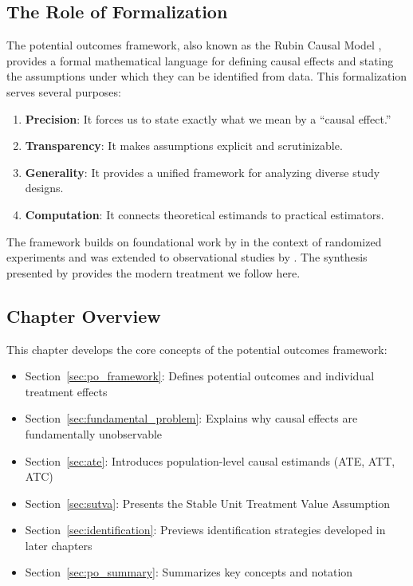 \subsection{The Role of Formalization}

The potential outcomes framework, also known as the Rubin Causal Model \cite{rubin1974estimating}, provides a formal mathematical language for defining causal effects and stating the assumptions under which they can be identified from data. This formalization serves several purposes:

\begin{enumerate}
    \item \textbf{Precision}: It forces us to state exactly what we mean by a ``causal effect.''
    \item \textbf{Transparency}: It makes assumptions explicit and scrutinizable.
    \item \textbf{Generality}: It provides a unified framework for analyzing diverse study designs.
    \item \textbf{Computation}: It connects theoretical estimands to practical estimators.
\end{enumerate}

The framework builds on foundational work by \cite{neyman1923application} in the context of randomized experiments and was extended to observational studies by \cite{rubin1974estimating, rubin1978bayesian}. The synthesis presented by \cite{imbens2015causal} provides the modern treatment we follow here.

\subsection{Chapter Overview}

This chapter develops the core concepts of the potential outcomes framework:
\begin{itemize}
    \item Section~\ref{sec:po_framework}: Defines potential outcomes and individual treatment effects
    \item Section~\ref{sec:fundamental_problem}: Explains why causal effects are fundamentally unobservable
    \item Section~\ref{sec:ate}: Introduces population-level causal estimands (ATE, ATT, ATC)
    \item Section~\ref{sec:sutva}: Presents the Stable Unit Treatment Value Assumption
    \item Section~\ref{sec:identification}: Previews identification strategies developed in later chapters
    \item Section~\ref{sec:po_summary}: Summarizes key concepts and notation
\end{itemize}


